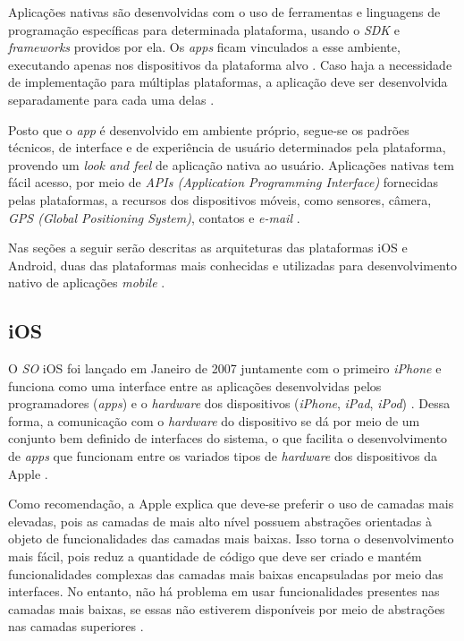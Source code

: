 Aplicações nativas são desenvolvidas com o uso de ferramentas e linguagens de programação específicas para determinada plataforma, 
usando o \textit{SDK} e \textit{frameworks} providos por ela. Os \textit{apps} ficam vinculados a esse ambiente, executando apenas 
nos dispositivos da plataforma alvo \cite{kassas_taxonomy_2015}. Caso haja a necessidade de implementação para múltiplas plataformas, 
a aplicação deve ser desenvolvida separadamente para cada uma delas \cite{heitkotter_evaluating_2013}.

Posto que o \textit{app} é desenvolvido em ambiente próprio, segue-se os padrões técnicos, de interface e de experiência de usuário determinados pela plataforma, provendo um \textit{look and feel} de aplicação nativa ao usuário.
Aplicações nativas tem fácil acesso, por meio de \textit{APIs (Application Programming Interface)} fornecidas pelas plataformas, a recursos dos dispositivos móveis, como sensores, câmera, \textit{GPS (Global Positioning System)}, contatos e \textit{e-mail} \cite{kassas_taxonomy_2015}.

Nas seções a seguir serão descritas as arquiteturas das plataformas iOS e Android, duas das plataformas mais conhecidas e utilizadas para desenvolvimento nativo de aplicações \textit{mobile} \cite{jobe_native_2013}.

\subsection{iOS} \label{subsection:ios}

O \textit{SO} iOS foi lançado em Janeiro de 2007 juntamente com o primeiro \textit{iPhone} e 
funciona como uma interface entre as aplicações desenvolvidas pelos programadores (\textit{apps}) e o \textit{hardware} 
dos dispositivos (\textit{iPhone}, \textit{iPad}, \textit{iPod}) \cite{apple_inc_apple_2007}. 
Dessa forma, a comunicação com o \textit{hardware} do dispositivo se dá 
por meio de um conjunto bem definido de interfaces do sistema, o que facilita o desenvolvimento de \textit{apps} 
que funcionam entre os variados tipos de \textit{hardware} dos dispositivos da Apple \cite{apple_inc_developing_2016}. 

Como recomendação, a Apple explica que deve-se preferir o uso de camadas mais elevadas, pois as camadas de 
mais alto nível possuem abstrações orientadas à objeto de funcionalidades das camadas mais baixas. Isso 
torna o desenvolvimento mais fácil, pois reduz a quantidade de código que deve ser criado e mantém funcionalidades 
complexas das camadas mais baixas encapsuladas por meio das interfaces. No entanto, não há problema em usar 
funcionalidades presentes nas camadas mais baixas, se essas não estiverem disponíveis por meio de abstrações nas 
camadas superiores \cite{apple_inc_tech_2014}. 

